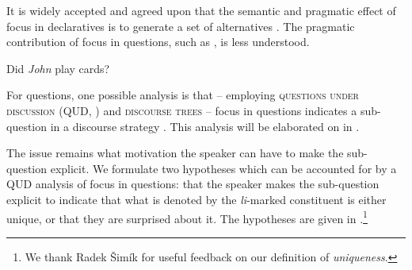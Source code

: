 \documentclass[output=paper]{langscibook}
\begin{document}
It is widely accepted and agreed upon that the semantic and pragmatic effect of focus in declaratives is to generate a set of alternatives \citep{rooth1992}.  The pragmatic contribution of focus in questions, such as , is less understood.



\ea Did \emph{John} play cards? \label{didjohn}
\z


\noindent
For questions, one possible analysis is that -- employing \textsc{questions under discussion} (QUD, \citealt{Roberts2012}) and \textsc{discourse trees} \citep{Buering2003} -- focus in questions indicates a sub-question in a discourse strategy \citep{biezma2009, kamali.buering2011}. This analysis will be elaborated on in .


The issue remains what motivation the speaker can have to make the sub-question explicit.
We formulate two hypotheses which can be accounted for by a QUD analysis of focus in questions: that the speaker makes the sub-question explicit to indicate that what is denoted by the \textit{li}-marked constituent is either unique, or that they are surprised about it. The hypotheses are given in .\footnote{We thank Radek Šimík for useful feedback on our definition of \textit{uniqueness}.}
\end{document}
